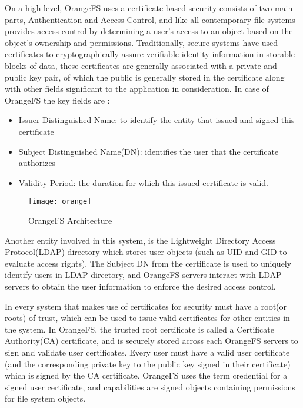 On a high level, OrangeFS uses a certificate based security consists of two main parts, Authentication and Access Control, and like all contemporary file systems provides access control by determining a user's access to an object based on the object's ownership and permissions. Traditionally, secure systems have used certificates to cryptographically assure verifiable identity information in storable blocks of data, these certificates are generally associated with a private and public key pair, of which the public is generally stored in the certificate along with other fields significant to the application in consideration. In case of OrangeFS the key fields are :
\begin{itemize}
\item Issuer Distinguished Name: to identify the entity that issued and signed this certificate
\item Subject Distinguished Name(DN): identifies the user that the certificate authorizes
\item Validity Period: the duration for which this issued certificate is valid.
\end{itemize} 

\begin{figure}[h]
\centering
\texttt{[image: orange]}
\caption{OrangeFS Architecture}
\label{fig:orange}
\end{figure}

Another entity involved in this system, is the Lightweight Directory Access Protocol(LDAP) directory which stores user objects (such as UID and GID to evaluate access rights). The Subject DN from the certificate is used to uniquely identify users in LDAP directory, and OrangeFS servers interact with LDAP servers to obtain the user information to enforce the desired access control. 

In every system that makes use of certificates for security must have a root(or roots) of trust, which can be used to issue valid certificates for other entities in the system. In OrangeFS, the trusted root certificate is called a Certificate Authority(CA) certificate, and is securely stored across each OrangeFS servers to sign and validate user certificates. Every user must have a valid user certificate (and the corresponding private key to the public key signed in their certificate) which is signed by the CA certificate. OrangeFS uses the term credential for a signed user certificate, and capabilities are signed objects containing permissions for file system objects.

